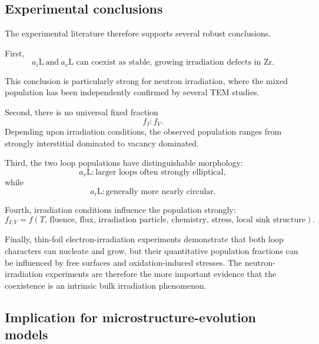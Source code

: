 \documentclass{article}
\newcommand{\aiL}{a_{i}\mathrm{L}}
\newcommand{\avL}{a_{v}\mathrm{L}}
\begin{document}
\subsection{Experimental conclusions}

The experimental literature therefore supports several robust conclusions.

First,
\begin{equation}
    \boxed{
    \aiL\ \text{and}\ \avL
    \text{ can coexist as stable, growing irradiation defects in Zr}.
    }
\end{equation}

This conclusion is particularly strong for neutron irradiation, where the mixed
population has been independently confirmed by several TEM studies.

Second, there is no universal fixed fraction
\begin{equation}
    f_I:f_V.
\end{equation}
Depending upon irradiation conditions, the observed population ranges from
strongly interstitial dominated to vacancy dominated.

Third, the two loop populations have distinguishable morphology:
\begin{equation}
    \avL:
    \text{larger loops often strongly elliptical},
\end{equation}
while
\begin{equation}
    \aiL:
    \text{generally more nearly circular}.
\end{equation}

Fourth, irradiation conditions influence the population strongly:
\begin{equation}
    f_{I,V}
    =
    f
    \left(
        T,\,
        \text{fluence},\,
        \text{flux},\,
        \text{irradiation particle},\,
        \text{chemistry},\,
        \text{stress},\,
        \text{local sink structure}
    \right).
\end{equation}

Finally, thin-foil electron-irradiation experiments demonstrate that both loop
characters can nucleate and grow, but their quantitative population fractions
can be influenced by free surfaces and oxidation-induced stresses. The
neutron-irradiation experiments are therefore the more important evidence that
the coexistence is an intrinsic bulk irradiation phenomenon.

\subsection{Implication for microstructure-evolution models}
\end{document}

